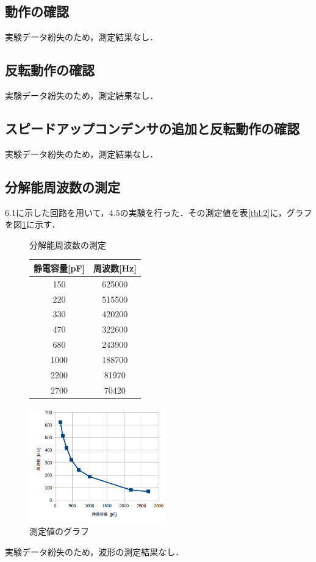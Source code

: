 \documentclass[10pt, a4j, dvipdfmx]{jarticle}
\makeatletter
\newcommand{\tblcaption}[1]{\def\@captype{table}\caption{#1}}
\makeatother
\begin{document}
    \subsection{動作の確認}
    実験データ紛失のため，測定結果なし．
    \subsection{反転動作の確認}
    実験データ紛失のため，測定結果なし．
    \subsection{スピードアップコンデンサの追加と反転動作の確認}
    実験データ紛失のため，測定結果なし．
    \subsection{分解能周波数の測定}
    6.1に示した回路を用いて，4.5の実験を行った．その測定値を表\ref{tbl:2}に，グラフを図\ref{fig:ex-5}に示す．
    \begin{figure}[H]
        \begin{minipage}{0.5\hsize}
            \centering
            \tblcaption{分解能周波数の測定}
            \label{tbl:2}
            \begin{tabular}{|c|c|}\hline
                静電容量[pF] & 周波数[Hz] \\\hline
                150 & 625000 \\\hline
                220 & 515500 \\\hline
                330 & 420200 \\\hline
                470 & 322600 \\\hline
                680 & 243900 \\\hline
                1000 & 188700 \\\hline
                2200 & 81970 \\\hline
                2700 & 70420 \\\hline
            \end{tabular}
        \end{minipage}
        \begin{minipage}{0.5\hsize}
          \centering
          \includegraphics[height=50mm]{images/ex-5.png}
          \caption{測定値のグラフ}
          \label{fig:ex-5}
        \end{minipage}
    \end{figure}
    実験データ紛失のため，波形の測定結果なし．
\end{document}
